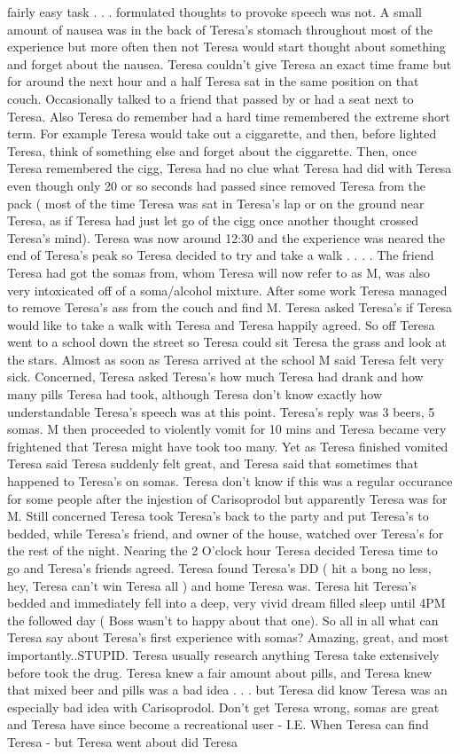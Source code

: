 \documentclass[12pt]{book}
\begin{document}
fairly easy task . . .  formulated thoughts to provoke speech was not. A small amount of nausea was in the back of Teresa's stomach throughout most of the experience but more often then not Teresa would start thought about something and forget about the nausea. Teresa couldn't give Teresa an exact time frame but for around the next hour and a half Teresa sat in the same position on that couch. Occasionally talked to a friend that passed by or had a seat next to Teresa. Also Teresa do remember had a hard time remembered the extreme short term. For example Teresa would take out a ciggarette, and then, before lighted Teresa, think of something else and forget about the ciggarette. Then, once Teresa remembered the cigg, Teresa had no clue what Teresa had did with Teresa even though only 20 or so seconds had passed since removed Teresa from the pack ( most of the time Teresa was sat in Teresa's lap or on the ground near Teresa, as if Teresa had just let go of the cigg once another thought crossed Teresa's mind). Teresa was now around 12:30 and the experience was neared the end of Teresa's peak so Teresa decided to try and take a walk . . .  . The friend Teresa had got the somas from, whom Teresa will now refer to as M, was also very intoxicated off of a soma/alcohol mixture. After some work Teresa managed to remove Teresa's ass from the couch and find M. Teresa asked Teresa's if Teresa would like to take a walk with Teresa and Teresa happily agreed. So off Teresa went to a school down the street so Teresa could sit Teresa the grass and look at the stars. Almost as soon as Teresa arrived at the school M said Teresa felt very sick. Concerned, Teresa asked Teresa's how much Teresa had drank and how many pills Teresa had took, although Teresa don't know exactly how understandable Teresa's speech was at this point. Teresa's reply was 3 beers, 5 somas. M then proceeded to violently vomit for 10 mins and Teresa became very frightened that Teresa might have took too many. Yet as Teresa finished vomited Teresa said Teresa suddenly felt great, and Teresa said that sometimes that happened to Teresa's on somas. Teresa don't know if this was a regular occurance for some people after the injestion of Carisoprodol but apparently Teresa was for M. Still concerned Teresa took Teresa's back to the party and put Teresa's to bedded, while Teresa's friend, and owner of the house, watched over Teresa's for the rest of the night. Nearing the 2 O'clock hour Teresa decided Teresa time to go and Teresa's friends agreed. Teresa found Teresa's DD ( hit a bong no less, hey, Teresa can't win Teresa all ) and home Teresa was. Teresa hit Teresa's bedded and immediately fell into a deep, very vivid dream filled sleep until 4PM the followed day ( Boss wasn't to happy about that one). So all in all what can Teresa say about Teresa's first experience with somas? Amazing, great, and most importantly..STUPID. Teresa usually research anything Teresa take extensively before took the drug. Teresa knew a fair amount about pills, and Teresa knew that mixed beer and pills was a bad idea . . .  but Teresa did know Teresa was an especially bad idea with Carisoprodol. Don't get Teresa wrong, somas are great and Teresa have since become a recreational user - I.E. When Teresa can find Teresa - but Teresa went about did Teresa 
\end{document}
